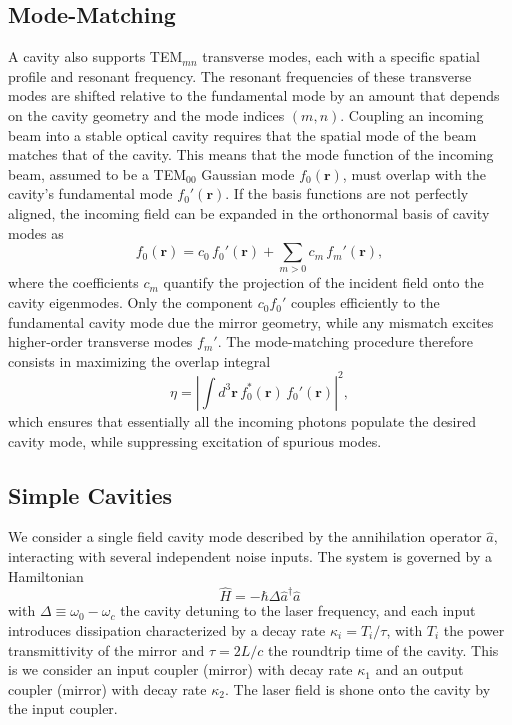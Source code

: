 \subsection{Mode-Matching}
A cavity also supports TEM$_{mn}$ transverse modes, each with a specific spatial profile and resonant frequency. The resonant frequencies of these transverse modes are shifted relative to the fundamental mode by an amount that depends on the cavity geometry and the mode indices $(m,n)$. Coupling an incoming beam into a stable optical cavity requires that the spatial mode of the beam matches that of the cavity. This means that the mode function of the incoming beam, assumed to be a TEM$_{00}$ Gaussian mode
 $f_{0}(\mathbf{r})$, must overlap with the cavity’s fundamental mode $f_{0}'(\mathbf{r})$. If the basis functions are not perfectly aligned, the incoming field can be expanded in the orthonormal basis of cavity modes as
\begin{equation}
    f_{0}(\mathbf{r}) = c_{0}\, f_{0}'(\mathbf{r}) + \sum_{m>0} c_{m}\, f_{m}'(\mathbf{r}),
\end{equation}
where the coefficients $c_{m}$ quantify the projection of the incident field onto the cavity eigenmodes. Only the component $c_{0} f_{0}'$ couples efficiently to the fundamental cavity mode due the mirror geometry, while any mismatch excites higher-order transverse modes $f_{m}'$. The mode-matching procedure therefore consists in maximizing the overlap integral
\begin{equation}
    \eta = \left| \int d^{3}\mathbf{r}\, f_{0}^{*}(\mathbf{r})\, f_{0}'(\mathbf{r}) \right|^{2},
\end{equation}
which ensures that essentially all the incoming photons populate the desired cavity mode, while suppressing excitation of spurious modes. \\

\subsection{\textrm{Simple} Cavities}

We consider a single field cavity mode described by the annihilation operator \(\hat{a}\), interacting with several independent noise inputs. The system is governed by a Hamiltonian 
\begin{equation}
\hat{H} = - \hbar \Delta  \hat{a}^\dagger \hat{a} 
\end{equation}
 with  $\Delta\equiv\omega_0 - \omega_c$ the cavity detuning to the laser frequency, and each input introduces dissipation characterized by a decay rate \(\kappa_i = T_i/\tau\), with $T_i$ the power transmittivity of the mirror and $\tau=2L/c$ the roundtrip time of the cavity. This is we consider an input coupler (mirror) with decay rate $\kappa_1$ and an output coupler (mirror) with decay rate $\kappa_2$. The laser field is shone onto the cavity by the input coupler. 
 
